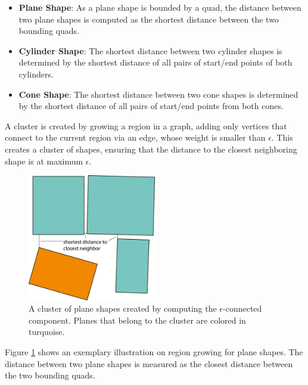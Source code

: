 \begin{itemize}
    \item \textbf{Plane Shape}:         As a plane shape is bounded by a quad, the distance between two plane shapes is computed as the shortest distance between the two bounding quads.
    \item \textbf{Cylinder Shape}:    The shortest distance between two cylinder shapes is determined by the shortest distance of all pairs of start/end points of both cylinders. 
  \item \textbf{Cone Shape}:            The shortest distance between two cone shapes is determined by the shortest distance of all pairs of start/end points from both cones. 
\end{itemize}


A cluster is created by growing a region in a graph, adding only vertices that connect to the current region via an edge, whose weight is smaller than $\epsilon$. This creates a cluster of shapes, ensuring that the distance to the closest neighboring shape is at maximum $\epsilon$. 
\\
\begin{figure}
    \centering
    \includegraphics[width=0.5\textwidth]{Shape_Detection/regionGrowingPlanes.png}
    \caption[Exemplary $\epsilon$-connected plane cluster]
		{A cluster of plane shapes created by computing the $\epsilon$-connected component. Planes that belong to the cluster are colored in turquoise.}
    \label{fig:regionGrowingPlanes}
\end{figure}

Figure \ref{fig:regionGrowingPlanes} shows an exemplary illustration on region growing for plane shapes. The distance between two plane shapes is measured as the closest distance between the two bounding quads. 

